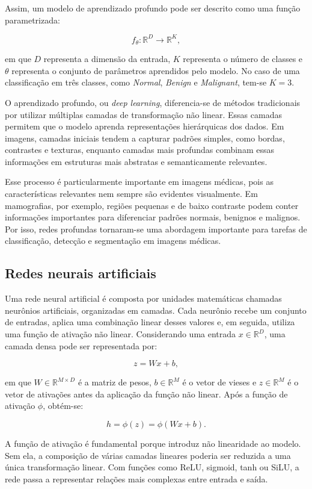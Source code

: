 \documentclass[
    12pt,
    openright,
    oneside,
    a4paper,
    english,
    brazil
]{abntex2}
\begin{document}
Assim, um modelo de aprendizado profundo pode ser descrito como uma função parametrizada:

\[
f_{\theta}: \mathbb{R}^{D} \rightarrow \mathbb{R}^{K},
\]

em que \(D\) representa a dimensão da entrada, \(K\) representa o número de classes e \(\theta\) representa o conjunto de parâmetros aprendidos pelo modelo. No caso de uma classificação em três classes, como \textit{Normal}, \textit{Benign} e \textit{Malignant}, tem-se \(K=3\).

O aprendizado profundo, ou \textit{deep learning}, diferencia-se de métodos tradicionais por utilizar múltiplas camadas de transformação não linear. Essas camadas permitem que o modelo aprenda representações hierárquicas dos dados. Em imagens, camadas iniciais tendem a capturar padrões simples, como bordas, contrastes e texturas, enquanto camadas mais profundas combinam essas informações em estruturas mais abstratas e semanticamente relevantes.

Esse processo é particularmente importante em imagens médicas, pois as características relevantes nem sempre são evidentes visualmente. Em mamografias, por exemplo, regiões pequenas e de baixo contraste podem conter informações importantes para diferenciar padrões normais, benignos e malignos. Por isso, redes profundas tornaram-se uma abordagem importante para tarefas de classificação, detecção e segmentação em imagens médicas.

\subsection{Redes neurais artificiais}

Uma rede neural artificial é composta por unidades matemáticas chamadas neurônios artificiais, organizadas em camadas. Cada neurônio recebe um conjunto de entradas, aplica uma combinação linear desses valores e, em seguida, utiliza uma função de ativação não linear. Considerando uma entrada \(x \in \mathbb{R}^{D}\), uma camada densa pode ser representada por:

\[
z = Wx + b,
\]

em que \(W \in \mathbb{R}^{M \times D}\) é a matriz de pesos, \(b \in \mathbb{R}^{M}\) é o vetor de vieses e \(z \in \mathbb{R}^{M}\) é o vetor de ativações antes da aplicação da função não linear. Após a função de ativação \(\phi\), obtém-se:

\[
h = \phi(z) = \phi(Wx + b).
\]

A função de ativação é fundamental porque introduz não linearidade ao modelo. Sem ela, a composição de várias camadas lineares poderia ser reduzida a uma única transformação linear. Com funções como ReLU, sigmoid, tanh ou SiLU, a rede passa a representar relações mais complexas entre entrada e saída.
\end{document}
